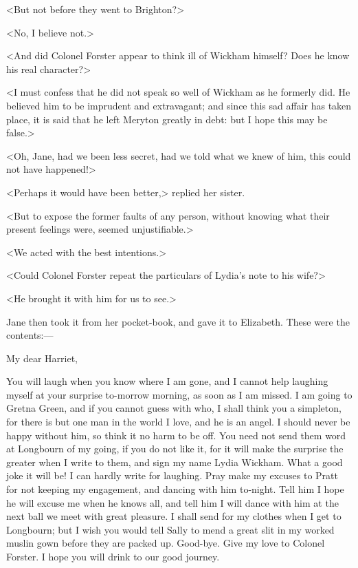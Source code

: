<But not before they went to Brighton?>

<No, I believe not.>

<And did Colonel Forster appear to think ill of Wickham himself? Does he know his real character?>

<I must confess that he did not speak so well of Wickham as he formerly did. He believed him to be imprudent and extravagant; and since this sad affair has taken place, it is said that he left Meryton greatly in debt: but I hope this may be false.>

<Oh, Jane, had we been less secret, had we told what we knew of him, this could not have happened!>

<Perhaps it would have been better,> replied her sister.

<But to expose the former faults of any person, without knowing what their present feelings were, seemed unjustifiable.>

<We acted with the best intentions.>

<Could Colonel Forster repeat the particulars of Lydia's note to his wife?>

<He brought it with him for us to see.>

Jane then took it from her pocket-book, and gave it to Elizabeth. These were the contents:—


\begin{mail}{}{My dear Harriet,}

You will laugh when you know where I am gone, and I cannot help laughing myself at your surprise to-morrow morning, as soon as I am missed. I am going to Gretna Green, and if you cannot guess with who, I shall think you a simpleton, for there is but one man in the world I love, and he is an angel. I should never be happy without him, so think it no harm to be off. You need not send them word at Longbourn of my going, if you do not like it, for it will make the surprise the greater when I write to them, and sign my name Lydia Wickham. What a good joke it will be! I can hardly write for laughing. Pray make my excuses to Pratt for not keeping my engagement, and dancing with him to-night. Tell him I hope he will excuse me when he knows all, and tell him I will dance with him at the next ball we meet with great pleasure. I shall send for my clothes when I get to Longbourn; but I wish you would tell Sally to mend a great slit in my worked muslin gown before they are packed up. Good-bye. Give my love to Colonel Forster. I hope you will drink to our good journey.

\end{mail}



